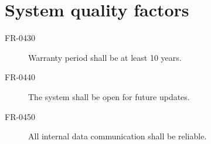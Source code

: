  \section{System quality factors}
 \begin{description}
 \item[FR-0430] Warranty period shall be at least 10 years.
 \item[FR-0440] The system shall be open for future updates.
 \item[FR-0450] All internal data communication shall be reliable.
 \end{description}